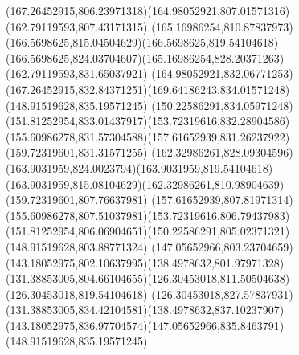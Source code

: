 {{		\curveto(167.26452915,806.23971318)(164.98052921,807.01571316)(162.79119593,807.43171315)
		\curveto(165.16986254,810.87837973)(166.5698625,815.04504629)(166.5698625,819.54104618)
		\curveto(166.5698625,824.03704607)(165.16986254,828.20371263)(162.79119593,831.65037921)
		\curveto(164.98052921,832.06771253)(167.26452915,832.84371251)(169.64186243,834.01571248)
		\moveto(148.91519628,835.19571245)
		\curveto(150.22586291,834.05971248)(151.81252954,833.01437917)(153.72319616,832.28904586)
		\curveto(155.60986278,831.57304588)(157.61652939,831.26237922)(159.72319601,831.31571255)
		\curveto(162.32986261,828.09304596)(163.9031959,824.0023794)(163.9031959,819.54104618)
		\curveto(163.9031959,815.08104629)(162.32986261,810.98904639)(159.72319601,807.76637981)
		\curveto(157.61652939,807.81971314)(155.60986278,807.51037981)(153.72319616,806.79437983)
		\curveto(151.81252954,806.06904651)(150.22586291,805.02371321)(148.91519628,803.88771324)
		\curveto(147.05652966,803.23704659)(143.18052975,802.10637995)(138.4978632,801.97971328)
		\curveto(131.38853005,804.66104655)(126.30453018,811.50504638)(126.30453018,819.54104618)
		\curveto(126.30453018,827.57837931)(131.38853005,834.42104581)(138.4978632,837.10237907)
		\curveto(143.18052975,836.97704574)(147.05652966,835.8463791)(148.91519628,835.19571245)
	}
}
